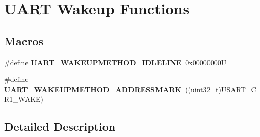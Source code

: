 \hypertarget{group___u_a_r_t___wake_up__functions}{}\section{U\+A\+RT Wakeup Functions}
\label{group___u_a_r_t___wake_up__functions}
\subsection*{Macros}
\begin{DoxyCompactItemize}
\item 
\mbox{\label{group___u_a_r_t___wake_up__functions_ga2411ed44c5d82db84c5819e1e2b5b8b3}} 
\#define {\bfseries U\+A\+R\+T\+\_\+\+W\+A\+K\+E\+U\+P\+M\+E\+T\+H\+O\+D\+\_\+\+I\+D\+L\+E\+L\+I\+NE}~0x00000000U
\item 
\mbox{\label{group___u_a_r_t___wake_up__functions_ga4c6935f26f8f2a9fe70fd6306a9882cb}} 
\#define {\bfseries U\+A\+R\+T\+\_\+\+W\+A\+K\+E\+U\+P\+M\+E\+T\+H\+O\+D\+\_\+\+A\+D\+D\+R\+E\+S\+S\+M\+A\+RK}~((uint32\+\_\+t)U\+S\+A\+R\+T\+\_\+\+C\+R1\+\_\+\+W\+A\+KE)
\end{DoxyCompactItemize}


\subsection{Detailed Description}
